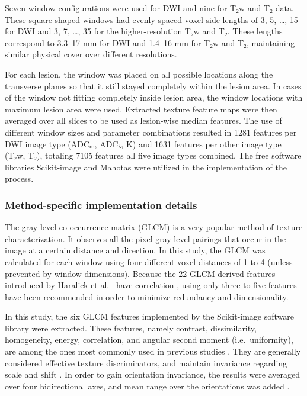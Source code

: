 \documentclass[10pt,letterpaper]{article}
\newcommand{\citep}{\cite}
\begin{document}
Seven window configurations were used for DWI and nine for T₂w and T₂
data. These square-shaped windows had evenly spaced voxel side lengths of 3, 5,
…, 15 for DWI and 3, 7, …, 35 for the higher-resolution T₂w and T₂. These
lengths correspond to 3.3--17 mm for DWI and 1.4--16 mm for T₂w and T₂,
maintaining similar physical cover over different resolutions.

For each lesion, the window was placed on all possible locations along the
transverse planes so that it still stayed completely within the lesion area. In
cases of the window not fitting completely inside lesion area, the window
locations with maximum lesion area were used. Extracted texture feature maps
were then averaged over all slices to be used as lesion-wise median features.
The use of different window sizes and parameter combinations resulted in 1281
features per DWI image type (ADCₘ, ADCₖ, K) and 1631 features per other image
type (T₂w, T₂), totaling 7105 features all five image types combined. The free
software libraries Scikit-image \citep{VanderWalt2014} and Mahotas
\citep{Coelho2013} were utilized in the implementation of the process.

\subsubsection{Method-specific implementation details}

The gray-level co-occurrence matrix (GLCM) \citep{Haralick1973} is a very
popular method of texture characterization. It observes all the pixel gray level
pairings that occur in the image at a certain distance and direction. In this
study, the GLCM was calculated for each window using four different voxel
distances of 1 to 4 (unless prevented by window dimensions). Because the 22
GLCM-derived features introduced by Haralick et al.\ \cite{Haralick1973} have
correlation \citep{Albregtsen2008}, using only three to five features have been
recommended \citep{Clausi2002Analysis, Albregtsen2008, Gebejes2013a} in order to
minimize redundancy and dimensionality.

In this study, the six GLCM features implemented by the Scikit-image software
library \citep{VanderWalt2014} were extracted. These features, namely contrast,
dissimilarity, homogeneity, energy, correlation, and angular second moment
(i.e.\ uniformity), are among the ones most commonly used in previous studies
\citep{Clausi2002Rapid}. They are generally considered effective texture
discriminators, and maintain invariance regarding scale and shift
\citep{Clausi2002Analysis}. In order to gain orientation invariance, the results
were averaged over four bidirectional axes, and mean range over the orientations
was added \citep{Haralick1973}.
\end{document}
